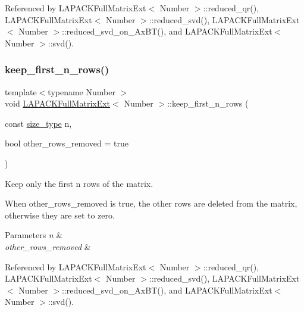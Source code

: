 Referenced by L\+A\+P\+A\+C\+K\+Full\+Matrix\+Ext$<$ Number $>$\+::reduced\+\_\+qr(), L\+A\+P\+A\+C\+K\+Full\+Matrix\+Ext$<$ Number $>$\+::reduced\+\_\+svd(), L\+A\+P\+A\+C\+K\+Full\+Matrix\+Ext$<$ Number $>$\+::reduced\+\_\+svd\+\_\+on\+\_\+\+Ax\+B\+T(), and L\+A\+P\+A\+C\+K\+Full\+Matrix\+Ext$<$ Number $>$\+::svd().

\mbox{\label{classLAPACKFullMatrixExt_a6cb733ec47cbcb9fed535362616d7e07}} 
\subsubsection{\texorpdfstring{keep\+\_\+first\+\_\+n\+\_\+rows()}{keep\_first\_n\_rows()}}
{\footnotesize\ttfamily template$<$typename Number $>$ \\
void \hyperlink{classLAPACKFullMatrixExt}{L\+A\+P\+A\+C\+K\+Full\+Matrix\+Ext}$<$ Number $>$\+::keep\+\_\+first\+\_\+n\+\_\+rows (\begin{DoxyParamCaption}\item[{const \hyperlink{classLAPACKFullMatrixExt_a5cf5f4a6104dc17029210b5ca52bf574}{size\+\_\+type}}]{n,  }\item[{bool}]{other\+\_\+rows\+\_\+removed = {\ttfamily true} }\end{DoxyParamCaption})}

Keep only the first n rows of the matrix.

When {\ttfamily other\+\_\+rows\+\_\+removed} is true, the other rows are deleted from the matrix, otherwise they are set to zero.


\begin{DoxyParams}{Parameters}
{\em n} & \\
\hline
{\em other\+\_\+rows\+\_\+removed} & \\
\hline
\end{DoxyParams}


Referenced by L\+A\+P\+A\+C\+K\+Full\+Matrix\+Ext$<$ Number $>$\+::reduced\+\_\+qr(), L\+A\+P\+A\+C\+K\+Full\+Matrix\+Ext$<$ Number $>$\+::reduced\+\_\+svd(), L\+A\+P\+A\+C\+K\+Full\+Matrix\+Ext$<$ Number $>$\+::reduced\+\_\+svd\+\_\+on\+\_\+\+Ax\+B\+T(), and L\+A\+P\+A\+C\+K\+Full\+Matrix\+Ext$<$ Number $>$\+::svd().

